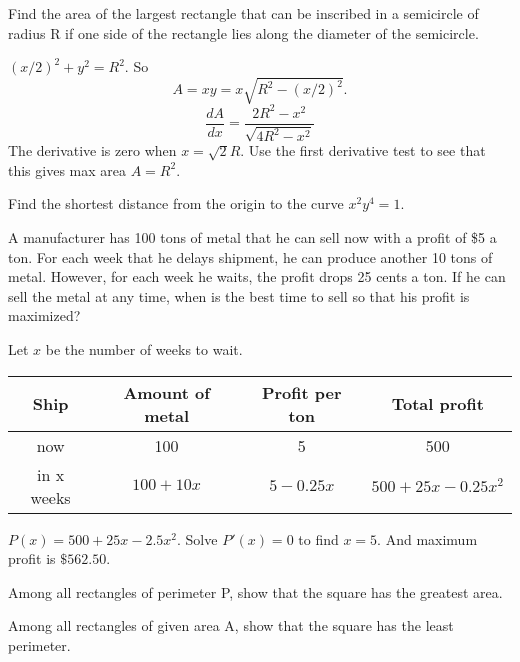 \documentclass[../main.tex]{subfiles}
\begin{document}
\begin{example}
  Find the area of the largest rectangle that can be inscribed in a semicircle of radius R if one side of the rectangle lies along the diameter of the semicircle.

\end{example}

\begin{minipage}{0.5\textwidth}
  \begin{solution}
    $(x/2)^2 + y^2 = R^2$. So
    \[
      A = x y = x \sqrt{R^2 - (x/2)^2}.
    \]
    \[
      \frac{dA}{dx} = \frac{2R^2 - x^2}{\sqrt{4R^2-x^2}}
    \]
    The derivative is zero when $x=\sqrt{2}R$. Use the first derivative test to see that this gives max area $A = R^2$.
  \end{solution}
\end{minipage}%
\begin{minipage}{0.5\textwidth}
  \centering
\end{minipage}
\begin{example}
  Find the shortest distance from the origin to the curve $x^2 y^4 = 1$.
\end{example}

\begin{example}
  A manufacturer has 100 tons of metal that he can sell now with a profit of \$5 a ton.  For each week that he delays shipment, he can produce another 10 tons of metal.  However, for each week he waits, the profit drops 25 cents a ton.  If he can sell the metal at any time, when is the best time to sell so that his profit is maximized?
\end{example}
\begin{solution}
  Let $x$ be the number of weeks to wait.
  \begin{table}[H]
    \centering
    \begin{tabular}{|c|c|c|c|}
      \hline
      Ship & Amount of metal & Profit per ton & Total profit \\
      \hline
      now & 100 & 5 & 500 \\
      in x weeks & $100+10x$ & $5-0.25 x$ & $500+25x-0.25 x^2$\\
      \hline
    \end{tabular}
  \end{table}
  $P(x) = 500 + 25x - 2.5x^2$. Solve $P'(x) = 0$ to find $x=5$. And maximum profit is $\$562.50$.
\end{solution}

\begin{example}
  Among all rectangles of perimeter P, show that the square has the greatest area.
\end{example}

\begin{example}
  Among all rectangles of given area A, show that the square has the least perimeter.
\end{example}
\end{document}
